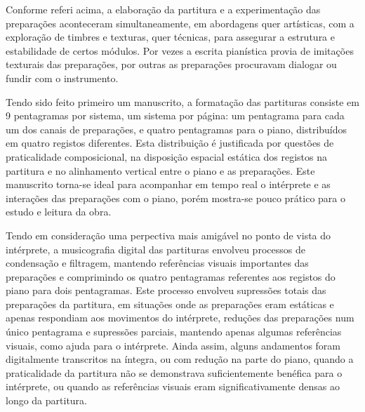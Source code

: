 \documentclass[../main.tex]{subfiles}
\begin{document}

Conforme referi acima, a elaboração da partitura e a experimentação das preparações aconteceram simultaneamente, em abordagens quer artísticas, com a exploração de timbres e texturas, quer técnicas, para assegurar a estrutura e estabilidade de certos módulos. Por vezes a escrita pianística provia de imitações texturais das preparações, por outras as preparações procuravam dialogar ou fundir com o instrumento.

Tendo sido feito primeiro um manuscrito, a formatação das partituras consiste em 9 pentagramas por sistema, um sistema por página: um pentagrama para cada um dos canais de preparações, e quatro pentagramas para o piano, distribuídos em quatro registos diferentes. Esta distribuição é justificada por questões de praticalidade composicional, na disposição espacial estática dos registos na partitura e no alinhamento vertical entre o piano e as preparações. Este manuscrito torna-se ideal para acompanhar em tempo real o intérprete e as interações das preparações com o piano, porém mostra-se pouco prático para o estudo e leitura da obra.


Tendo em consideração uma perpectiva mais amigável no ponto de vista do intérprete, a musicografia digital das partituras envolveu processos de condensação e filtragem, mantendo referências visuais importantes das preparações e comprimindo os quatro pentagramas referentes aos registos do piano para dois pentagramas. Este processo envolveu supressões totais das preparações da partitura, em situações onde as preparações eram estáticas e apenas respondiam aos movimentos do intérprete, reduções das preparações num único pentagrama e supressões parciais, mantendo apenas algumas referências visuais, como ajuda para o intérprete. Ainda assim, alguns andamentos foram digitalmente transcritos na íntegra, ou com redução na parte do piano, quando a praticalidade da partitura não se demonstrava suficientemente benéfica para o intérprete, ou quando as referências visuais eram significativamente densas ao longo da partitura.

\end{document}
